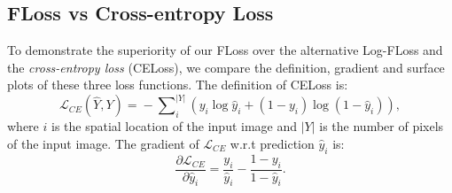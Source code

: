 \documentclass[10pt,twocolumn,letterpaper]{article}
\newcommand{\CheckRmv}[1]{}
\newcommand{\CheckRmv}[1]{#1}
\begin{document}
\subsection{FLoss vs Cross-entropy Loss}\label{sec:cel-vs-floss}
To demonstrate the superiority of our  FLoss over the alternative Log-FLoss and
the \emph{cross-entropy loss} (CELoss),
we compare the definition, gradient and surface plots of these three loss functions.
%
The definition of CELoss is:
\begin{equation}
\mathcal{L}_{CE}(\hat{Y}, Y) \!=\! -\sum\nolimits_i^{|Y|} 
\left(y_i  \log{\hat{y}_i} + (1\!-\!y_i)  \log{(1\!-\!\hat{y}_i)}\right),
\label{eq:celoss}
\end{equation}
where $i$ is the spatial location of the input image and $|Y|$ is the number of pixels of the input image.
%
The gradient of $\mathcal{L}_{CE}$ w.r.t prediction $\hat{y}_i$ is:
\begin{equation}
\frac{\partial \mathcal{L}_{CE}}{\partial \hat{y}_i} = \frac{y_i}{\hat{y}_i} - \frac{1 - y_i}{1 - \hat{y}_i}.
\label{eq:grad-celoss}
\end{equation}

\CheckRmv{
\begin{figure*}[!htb]
  \centering
  \begin{overpic}[width=0.9\linewidth]{figures/loss-surface-crop}
  \put(7,53){FLoss (Eq.~\ref{eq:floss})}
  \put(42,53){Log-FLoss (Eq.~\ref{eq:logfloss})}
  \put(77,53){CELoss (Eq.~\ref{eq:celoss})}
  \put(7,25){FLoss (Eq.~\ref{eq:floss})}
  \put(42,25){Log-FLoss (Eq.~\ref{eq:logfloss})}
  \put(77,25){CELoss (Eq.~\ref{eq:celoss})}
  \put(-3,38){\rotatebox{90}{\small{GT=[0, 1]}}}
  \put(-3,10){\rotatebox{90}{\small{GT=[1, 1]}}}
  \end{overpic}\vspace{2pt}
  \caption{Surface plot of different loss functions in a 2-point 2-class classification circumstance.
  Columns from left to right: F-measure loss defined in Eq.~\ref{eq:floss},
  log F-measure loss defined in Eq.~\ref{eq:logfloss} and
  cross-entropy loss in Eq.~\ref{eq:celoss}.
  In top row the ground-truth is [0, 1] and in bottom row the ground-truth
  is [1, 1].
  Compared with cross-entropy loss and Log-FLoss,
  FLoss holds considerable gradient even in the saturated area, which will force
  to produce polarized predictions.
  }\label{fig:loss-surface}\vspace{-6pt}
\end{figure*}
}
\end{document}
